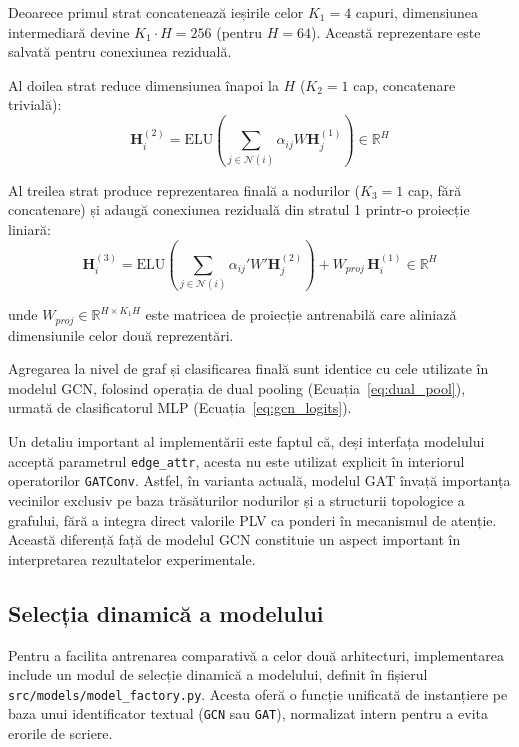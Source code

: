 \documentclass[12pt,a4paper]{report}
\theoremstyle{definition}
\theoremstyle{remark}
\begin{document}
Deoarece primul strat concatenează ieșirile celor $K_1 = 4$ capuri, dimensiunea intermediară devine $K_1 \cdot H = 256$ (pentru $H = 64$). Această reprezentare este salvată pentru conexiunea reziduală.

Al doilea strat reduce dimensiunea înapoi la $H$ ($K_2 = 1$ cap, concatenare trivială):
\begin{equation}
    \mathbf{H}^{(2)}_i =
    \text{ELU}\!\left(
    \sum_{j \in \mathcal{N}(i)} \alpha_{ij} W \mathbf{H}^{(1)}_j
    \right) \in \mathbb{R}^{H}
    \label{eq:gat_layer2_impl}
\end{equation}

Al treilea strat produce reprezentarea finală a nodurilor ($K_3 = 1$ cap, fără concatenare) și adaugă conexiunea reziduală din stratul 1 printr-o proiecție liniară:
\begin{equation}
    \mathbf{H}^{(3)}_i =
    \text{ELU}\!\left(
    \sum_{j \in \mathcal{N}(i)} \alpha_{ij}' W' \mathbf{H}^{(2)}_j
    \right) + W_{proj}\,\mathbf{H}^{(1)}_i \in \mathbb{R}^{H}
    \label{eq:gat_layer3_impl}
\end{equation}

\noindent unde $W_{proj} \in \mathbb{R}^{H \times K_1 H}$ este matricea de proiecție antrenabilă care aliniază dimensiunile celor două reprezentări.

Agregarea la nivel de graf și clasificarea finală sunt identice cu cele utilizate în modelul GCN, folosind operația de dual pooling (Ecuația~\ref{eq:dual_pool}), urmată de clasificatorul MLP (Ecuația~\ref{eq:gcn_logits}).

Un detaliu important al implementării este faptul că, deși interfața modelului acceptă parametrul \texttt{edge\_attr}, acesta nu este utilizat explicit în interiorul operatorilor \texttt{GATConv}. Astfel, în varianta actuală, modelul GAT învață importanța vecinilor exclusiv pe baza trăsăturilor nodurilor și a structurii topologice a grafului, fără a integra direct valorile PLV ca ponderi în mecanismul de atenție. Această diferență față de modelul GCN constituie un aspect important în interpretarea rezultatelor experimentale.

\subsection{Selecția dinamică a modelului}

Pentru a facilita antrenarea comparativă a celor două arhitecturi, implementarea include un modul de selecție dinamică a modelului, definit în fișierul \texttt{src/models/model\_factory.py}. Acesta oferă o funcție unificată de instanțiere pe baza unui identificator textual (\texttt{GCN} sau \texttt{GAT}), normalizat intern pentru a evita erorile de scriere.
\end{document}
